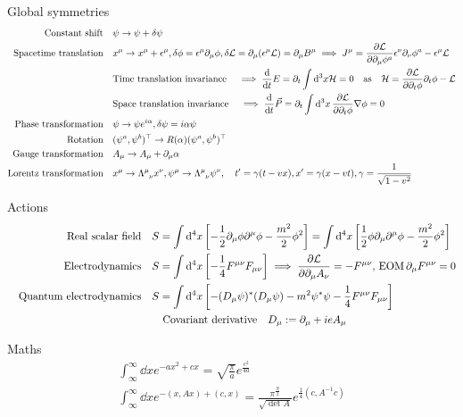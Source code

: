 \documentclass{article}
\newcommand{\La}{\mathcal{L}}
\newcommand{\ra}{\rightarrow}
\begin{document}
Global symmetries
\begin{align}
    \text{Constant shift}& \quad \psi \ra \psi + \delta \psi\\
    \text{Spacetime translation}& \quad x^{\mu} \ra x^{\mu} + \epsilon^{\mu}, \delta \phi = \epsilon^{\mu}\partial_\mu\phi, \delta\La = \partial_\mu(\epsilon^{\mu}\La) = \partial_\mu B^{\mu} \implies J^\mu = \pdv{\La}{\partial_{\mu}\phi^{a}}\epsilon^{\nu}\partial_{\nu}\phi^a - \epsilon^{\mu}\La\\
    & \qq{Time translation invariance} \implies \dv{}{t}E = \partial_t\int\dd[3]x\mathcal{H} = 0 \qas \mathcal{H} = \pdv{\mathcal{L}}{\partial_t\phi}\partial_t\phi - \mathcal{L}\\
    & \qq{Space translation invariance} \implies \dv{}{t}\vec P = \partial_t\int \dd[3]{x} \pdv{\mathcal{L}}{\partial_t\phi}\nabla\phi = 0\\
    \text{Phase transformation}& \quad \psi \ra \psi e^{i\alpha}, \delta\psi = i\alpha\psi\\
    \text{Rotation}& \quad (\psi^a, \psi^b)^\top \ra R(\alpha)(\psi^a, \psi^b)^\top\\
    \text{Gauge transformation}& \quad A_\mu \ra A_\mu + \partial_\mu \alpha\\
    \text{Lorentz transformation}& \quad x^\mu \ra \Lambda\indices{^\mu_\nu} x^\nu, \psi^\mu \ra \Lambda\indices{^\mu_\nu} \psi^\nu, \quad t'=\gamma(t-vx), x' = \gamma(x-vt), \gamma=\frac{ 1}{\sqrt{1-v^2}}
\end{align}

Actions
\begin{align}
    \qq{Real scalar field} &
    S = \int\dd[4]{x} \qty[-\frac{ 1}{2}\partial_\mu\phi\partial^{\mu}\phi - \frac{m^2}{2}\phi^2] = \int\dd[4]{x} \qty[\frac{ 1}{2}\phi\partial_\mu\partial^{\mu}\phi - \frac{m^2}{2}\phi^2]\label{eq:real-scalar-field}\\
    \qq{Electrodynamics} &
    S = \int\dd[4]{x} \qty[-\frac{1}{4}F^{\mu\nu}F_{\mu\nu}] \implies \pdv{\La}{\partial_\mu A_\nu} = -F^{\mu\nu},\,\text{EOM}\, \partial_\mu F^{\mu\nu} = 0\\
    \qq{Quantum electrodynamics} &
    S = \int\dd[4]{x} \qty[-(D_{\mu }\psi )^*(D_{\mu }\psi ) - m^2 \psi ^*\psi - \frac{1}{4}F^{\mu \nu }F_{\mu \nu }]\\
    & \qq{Covariant derivative} D_{\mu } := \partial_{\mu } + ieA_{\mu }
\end{align}

Maths
\begin{gather}
\int^\infty_\infty\dd{x}e^{-ax^{2}+cx} = \sqrt{\frac{\pi}{a}}e^{\frac{c^2}{4a}}\\
\int^\infty_\infty\dd{x}e^{-(x,Ax)+(c,x)} = \frac{\pi^{\frac{N}{2}}}{\sqrt{\det A}} e^{\frac{1}{4}(c,A^{-1}c)}
\end{gather}
\end{document}
